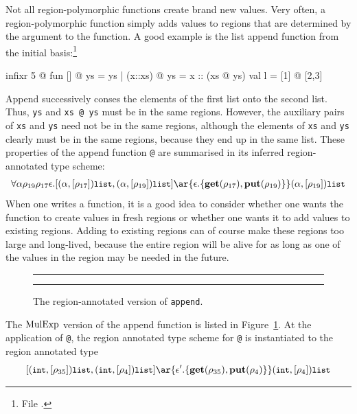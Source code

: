 \documentclass[12pt]{book}
\begin{document}
Not all region-polymorphic functions create brand new values. Very often, a
region-polymorphic function simply adds values to regions that are determined by
the argument to the function. A good example is the list append function from
the initial basis:\footnote{File .}
\begin{smlcode}
  infixr 5 @
  fun [] @ ys = ys
    | (x::xs) @ ys = x :: (xs @ ys)
  val l = [1] @ [2,3]
\end{smlcode}
Append successively conses the elements of the first list onto the second list.
Thus, \lstinline{ys} and \lstinline{xs @ ys} must be in the same
regions. However, the auxiliary pairs of \lstinline{xs} and \lstinline{ys} need
not be in the same regions, although the elements of \lstinline{xs} and
\lstinline{ys} clearly must be in the same regions, because they end up in the
same list. These properties of the append function \lstinline{@} are summarised
in its inferred region-annotated type scheme:
$$\begin{array}{c}\forall\alpha\rho_{19}\rho_{17}\epsilon.
   [ (\alpha,[\rho_{17}])\kw{list},
      (\alpha,[\rho_{19}])\kw{list} ]
\ar{\epsilon.\{\Get(\rho_{17}),\Put(\rho_{19})\}} (\alpha,[\rho_{19}])\kw{list}\end{array}
$$ When one writes a function, it is a good idea to consider whether one wants
the function to create values in fresh regions or whether one wants it to add
values to existing regions.  Adding to existing regions can of course make these
regions too large and long-lived, because the entire region will be alive for as
long as one of the values in the region may be needed in the future.

\begin{figure}[htb]
\hrule
\medskip
{}
\caption{The region-annotated version of {\tt append}.}
\medskip
\hrule
\label{append.fig}
\end{figure}

The $\hbox{\rm MulExp}$ version of the append function is listed in
Figure~\ref{append.fig}. At the application of \lstinline{@}, the region
annotated type scheme for \lstinline{@} is instantiated to the region annotated type
$$[ (\kw{int},[\rho_{35}])\kw{list},
      (\kw{int},[\rho_4])\kw{list} ]
\ar{\epsilon'.\{\Get(\rho_{35}),\Put(\rho_4)\}} (\kw{int},[\rho_4])\kw{list} $$
\end{document}
